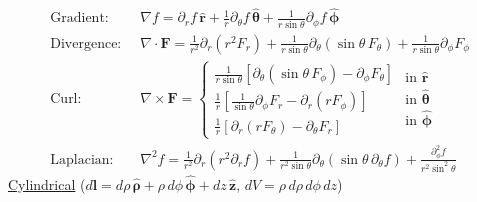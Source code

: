 \begin{align*}
\text{Gradient:}   \;\; &\nabla f = \partial_r f\,\hat{\mathbf{r}} 
                                 + \frac{1}{r}\partial_\theta f\,\bm{\hat{\theta}} 
                                 + \frac{1}{r\sin\theta}\partial_\phi f\,\bm{\hat{\phi}} \\
\text{Divergence:} \;\; &\nabla \cdot \mathbf{F} = \frac{1}{r^2}\partial_r (r^2 F_r) 
                                 + \frac{1}{r\sin\theta}\partial_\theta (\sin\theta\,F_\theta) 
                                 + \frac{1}{r\sin\theta}\partial_\phi F_\phi \\
\text{Curl:}       \;\; &\nabla \times \mathbf{F} = \begin{cases}
                                  \frac{1}{r\sin\theta}\left[\partial_\theta (\sin\theta\,F_\phi) - \partial_\phi F_\theta\right] \\[3pt]
                                  \frac{1}{r}\left[\frac{1}{\sin\theta}\partial_\phi F_r - \partial_r (r F_\phi)\right] \\[3pt]
                                  \frac{1}{r}\left[\partial_r (r F_\theta) - \partial_\theta F_r\right]
                                  \end{cases}
                                  \begin{matrix}
                                  \text{in } \hat{\mathbf{r}} \\[3pt]
                                  \text{in } \bm{\hat{\theta}} \\[3pt]
                                  \text{in } \bm{\hat{\phi}}
                                  \end{matrix} \\
\text{Laplacian:}  \;\; &\nabla^2 f = \frac{1}{r^2}\partial_r \left(r^2\partial_r f\right) 
                                 + \frac{1}{r^2\sin\theta}\partial_\theta \left(\sin\theta\,\partial_\theta f\right) 
                                 + \frac{\partial^2_\phi f}{r^2\sin^2\theta}
\end{align*}
\underline{Cylindrical} ($d\mathbf{l} = d\rho\,\bm{\hat{\rho}} + \rho\,d\phi\,\bm{\hat{\phi}} + dz\,\hat{\mathbf{z}}$, $dV = \rho\,d\rho\,d\phi\,dz$)
